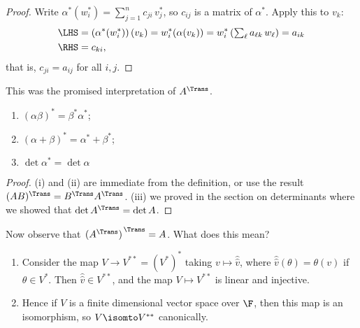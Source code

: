 \begin{proof}
	Write $\alpha^*(w_i^*) = \sum_{j=1}^n c_{ji} \, v_j^*$, so $c_{ij}$ is a matrix of $\alpha^*$. Apply this to $v_k$: %
	\begin{align*}
		\LHS
		&= \left( \alpha^* (w_i^*) \right)(v_k)
		 = w_i^*(\alpha(v_k))
		 = w_i^*\left( \textstyle\sum_\ell a_{\ell k} \,w_\ell \right) = a_{ik} \\
		\RHS
		&= c_{ki},
	\end{align*}
	that is, $c_{ji}=a_{ij}$ for all $i,j$.
\end{proof}
 This was the promised interpretation of $A^\Trans$. %


\begin{corollary}
\mbox{}
\begin{enumerate}
	\shortskip
	\item $(\alpha\beta)^* = \beta^* \alpha^*$;
	\item $(\alpha+\beta)^* = \alpha^* + \beta^*$;
	\item $\det \alpha^* = \det\alpha$
\end{enumerate}
\end{corollary}

\begin{proof}
	(i) and (ii) are immediate from the definition, or use the result $(AB)^\Trans = B^\Trans A^\Trans$. (iii) we proved in the section on determinants where we showed that $\det A^\Trans=\det A$. %
\end{proof}

Now observe that $\left.(A^\Trans)\right.^\Trans = A$. What does this mean?

\begin{proposition}
\mbox{}
\begin{enumerate}
	\item Consider the map $V\to V^{**} = (V^*)^*$ taking $v\mapsto \hat{\hat{v}}$, where $\hat{\hat{v}}(\theta) = \theta(v)$ if $\theta\in V^*$. Then $\hat{\hat{v}} \in V^{**}$, and the map $V\mapsto V^{**}$ is linear and injective. %
	\item Hence if $V$ is a finite dimensional vector space over $\F$, then this map is an isomorphism, so $V\isomto V^{**}$ canonically. %
\end{enumerate}
\end{proposition}

